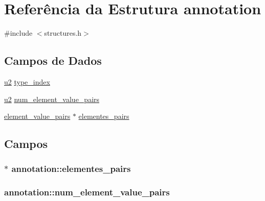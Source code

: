 \hypertarget{structannotation}{}\section{Referência da Estrutura annotation}
\label{structannotation}


{\ttfamily \#include $<$structures.\+h$>$}

\subsection*{Campos de Dados}
\begin{DoxyCompactItemize}
\item 
\hyperlink{lista__operandos_8h_a732cde1300aafb73b0ea6c2558a7a54f}{u2} \hyperlink{structannotation_ac1579f92b65639fa8646311a2520e58c}{type\+\_\+index}
\item 
\hyperlink{lista__operandos_8h_a732cde1300aafb73b0ea6c2558a7a54f}{u2} \hyperlink{structannotation_a5f584027263eca714f8ee8fc02fcc2ac}{num\+\_\+element\+\_\+value\+\_\+pairs}
\item 
\hyperlink{structelement__value__pairs}{element\+\_\+value\+\_\+pairs} $\ast$ \hyperlink{structannotation_a4b33f66e2657ea077cec0392e82a0ce5}{elementes\+\_\+pairs}
\end{DoxyCompactItemize}


\subsection{Campos}
\subsubsection[{\texorpdfstring{elementes\+\_\+pairs}{elementes_pairs}}]{$\ast$ annotation\+::elementes\+\_\+pairs}\hypertarget{structannotation_a4b33f66e2657ea077cec0392e82a0ce5}{}\label{structannotation_a4b33f66e2657ea077cec0392e82a0ce5}
\subsubsection[{\texorpdfstring{num\+\_\+element\+\_\+value\+\_\+pairs}{num_element_value_pairs}}]{ annotation\+::num\+\_\+element\+\_\+value\+\_\+pairs}\hypertarget{structannotation_a5f584027263eca714f8ee8fc02fcc2ac}{}\label{structannotation_a5f584027263eca714f8ee8fc02fcc2ac}
